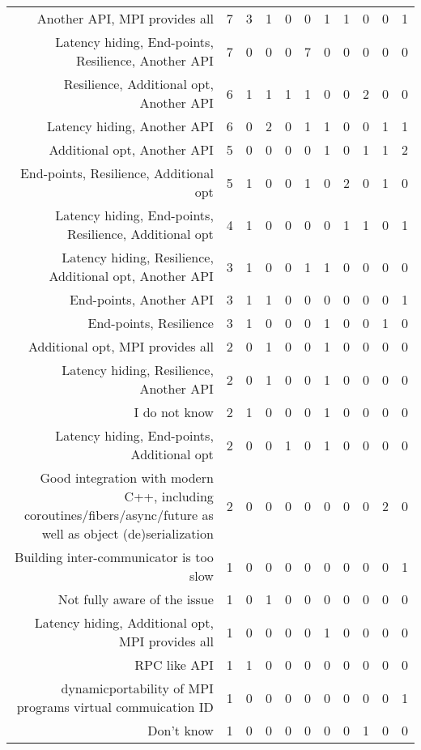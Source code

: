 {\begin{landscape}
\begin{longtable}[htb]{r|c|c|c|c|c|c|c|c|c|c}
{Another API, MPI provides all} & 7 & 3 & 1 & 0 & 0 & 1 & 1 & 0 & 0 & 1 \\%
{Latency hiding, End-points, Resilience, Another API} & 7 & 0 & 0 & 0 & 7 & 0 & 0 & 0 & 0 & 0 \\%
{Resilience, Additional opt, Another API} & 6 & 1 & 1 & 1 & 1 & 0 & 0 & 2 & 0 & 0 \\%
{Latency hiding, Another API} & 6 & 0 & 2 & 0 & 1 & 1 & 0 & 0 & 1 & 1 \\%
{Additional opt, Another API} & 5 & 0 & 0 & 0 & 0 & 1 & 0 & 1 & 1 & 2 \\%
{End-points, Resilience, Additional opt} & 5 & 1 & 0 & 0 & 1 & 0 & 2 & 0 & 1 & 0 \\%
{Latency hiding, End-points, Resilience, Additional opt} & 4 & 1 & 0 & 0 & 0 & 0 & 1 & 1 & 0 & 1 \\%
{Latency hiding, Resilience, Additional opt, Another API} & 3 & 1 & 0 & 0 & 1 & 1 & 0 & 0 & 0 & 0 \\%
{End-points, Another API} & 3 & 1 & 1 & 0 & 0 & 0 & 0 & 0 & 0 & 1 \\%
{End-points, Resilience} & 3 & 1 & 0 & 0 & 0 & 1 & 0 & 0 & 1 & 0 \\%
{Additional opt, MPI provides all} & 2 & 0 & 1 & 0 & 0 & 1 & 0 & 0 & 0 & 0 \\%
{Latency hiding, Resilience, Another API} & 2 & 0 & 1 & 0 & 0 & 1 & 0 & 0 & 0 & 0 \\%
{I do not know} & 2 & 1 & 0 & 0 & 0 & 1 & 0 & 0 & 0 & 0 \\%
{Latency hiding, End-points, Additional opt} & 2 & 0 & 0 & 1 & 0 & 1 & 0 & 0 & 0 & 0 \\%
{Good integration with modern C++, including coroutines/fibers/async/future as well as object (de)serialization} & 2 & 0 & 0 & 0 & 0 & 0 & 0 & 0 & 2 & 0 \\%
{Building inter-communicator is too slow} & 1 & 0 & 0 & 0 & 0 & 0 & 0 & 0 & 0 & 1 \\%
{Not fully aware of the issue} & 1 & 0 & 1 & 0 & 0 & 0 & 0 & 0 & 0 & 0 \\%
{Latency hiding, Additional opt, MPI provides all} & 1 & 0 & 0 & 0 & 0 & 1 & 0 & 0 & 0 & 0 \\%
{RPC like API} & 1 & 1 & 0 & 0 & 0 & 0 & 0 & 0 & 0 & 0 \\%
{dynamicportability of MPI programs virtual commuication ID} & 1 & 0 & 0 & 0 & 0 & 0 & 0 & 0 & 0 & 1 \\%
{Don't know} & 1 & 0 & 0 & 0 & 0 & 0 & 0 & 1 & 0 & 0 \\%

\end{longtable}
\end{landscape}}
